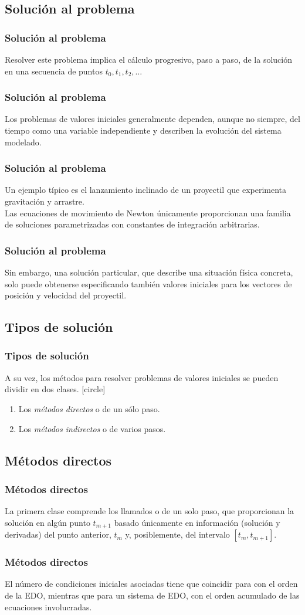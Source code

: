 \subsection*{Solución al problema}
\begin{frame}
\frametitle{Solución al problema}
Resolver este problema implica el cálculo progresivo, paso a paso, de la solución en una secuencia de puntos $t_{0}, t_{1}, t_{2}, \ldots$
\end{frame}
\begin{frame}
\frametitle{Solución al problema}
Los problemas de valores iniciales generalmente dependen, aunque no siempre, del tiempo como una variable independiente y describen la evolución del sistema modelado.
\end{frame}
\begin{frame}
\frametitle{Solución al problema}
Un ejemplo típico es el lanzamiento inclinado de un proyectil que experimenta gravitación y arrastre.
\\
\bigskip
Las ecuaciones de movimiento de Newton únicamente proporcionan una familia de soluciones parametrizadas con constantes de integración arbitrarias. 
\end{frame}
\begin{frame}
\frametitle{Solución al problema}
Sin embargo, una solución particular, que describe una situación física concreta, solo puede obtenerse especificando también valores iniciales para los vectores de posición y velocidad del proyectil.
\end{frame}
\subsection*{Tipos de solución}
\begin{frame}
\frametitle{Tipos de solución}
A su vez, los métodos para resolver problemas de valores iniciales se pueden dividir en dos clases. 
[circle]
\begin{enumerate}[<+->]
\item Los \emph{métodos directos} o de un sólo paso.
\item Los \emph{métodos indirectos} o de varios pasos.
\end{enumerate}
\end{frame}
\subsection*{Métodos directos}
\begin{frame}
\frametitle{Métodos directos}
La primera clase comprende los llamados  o de un solo paso, que proporcionan la solución en algún punto $t_{m+1}$ basado únicamente en información (solución y derivadas) del punto anterior, $t_{m}$ y, posiblemente, del intervalo $[t_{m} , t_{m + 1}]$.
\end{frame}
\begin{frame}
\frametitle{Métodos directos}
El número de condiciones iniciales asociadas tiene que coincidir para con el orden de la EDO, mientras que para un sistema de EDO, con el orden acumulado de las ecuaciones involucradas.
\end{frame}
